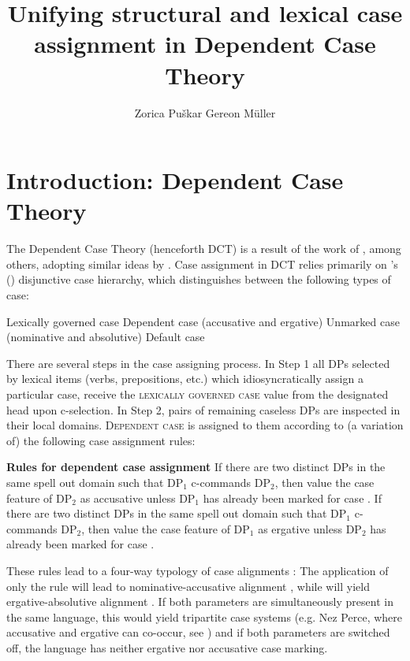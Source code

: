 \documentclass[output=paper,
modfonts,
newtxmath,
hidelinks
]{langscibook}
\title{Unifying structural and lexical case assignment in Dependent Case Theory}
\author{%
 Zorica Puškar\affiliation{Leibniz-Zentrum Allgemeine Sprachwissenschaft, Berlin}\lastand 
 Gereon Müller\affiliation{University of Leipzig}
}
\begin{document}
\maketitle
{}

\section{Introduction: Dependent Case Theory} 


The Dependent Case Theory (henceforth DCT) is a result of the work of \citep{marantz91,mcfadden04,bakervinokurova,baker12,baker15}, among others, adopting similar ideas by \citet{yipetal87,bittnerhale96,kiparsky92,kiparsky2001,wunderlich97,stiebels2002}. Case assignment in DCT relies primarily on \citeauthor{marantz91}'s (\citeyear[24]{marantz91}) disjunctive case hierarchy, which distinguishes between the following types of case:

\ea Lexically governed case \before{} Dependent case (accusative and ergative) \before{} Unmarked case (nominative and absolutive) \before{} Default case 
\z

\noindent There are several steps in the case assigning process. In Step 1 all DPs selected by lexical items (verbs, prepositions, etc.) which idiosyncratically assign a particular case, receive the \textsc{lexically governed case} value from the designated head upon c-selection. In Step 2, pairs of remaining caseless DPs are inspected in their local domains. \textsc{Dependent case} is assigned to them according to (a variation of) the following case assignment rules: 

\ea\label{ex2} \textbf{Rules for dependent case assignment} \citep[48-49]{baker15}
\ea\label{ex2a} If there are two distinct DPs in the same spell out domain such that DP$_1$ c-commands DP$_2$, then value the case feature of DP$_2$ as accusative unless DP$_1$ has already been marked for case . 
\ex\label{ex2b} If there are two distinct DPs in the same spell out domain such that DP$_1$ c-commands DP$_2$, then value the case feature of DP$_1$ as ergative unless DP$_2$ has already been marked for case . 
\z \z

\noindent These rules lead to a four-way typology of case alignments \citep{levinpreminger}: The application of only the rule  will lead to nominative-accusative alignment , while  will yield ergative-absolutive alignment . If both parameters are simultaneously present in the same language, this would yield tripartite case systems (e.g. Nez Perce, where accusative and ergative can co-occur, see \citealt{baker15}) and if both parameters are switched off, the language has neither ergative nor accusative case marking.
\end{document}

